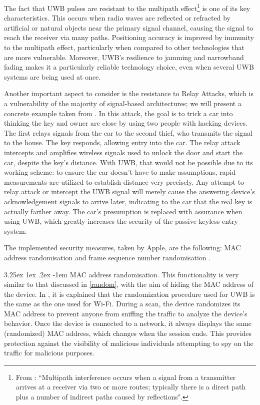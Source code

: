 \documentclass[english]{article}
\makeatletter
\newcounter{subsubsubsection}[subsubsection]
\renewcommand\paragraph{\@startsection{paragraph}{5}{\z@}%
  {3.25ex \@plus1ex \@minus.2ex}%
  {-1em}%
  {\normalfont\normalsize\bfseries}}
\makeatother
\begin{document}
The fact that UWB pulses are resistant to the multipath effect\footnote{From \cite{Figueroa2022}: ``Multipath interference occurs when a signal from a transmitter arrives at a receiver via two or more routes; typically there is a direct path plus a number of indirect paths caused by reflections".} is one of its key characteristics. This occurs when radio waves are reflected or refracted by artificial or natural objects near the primary signal channel, causing the signal to reach the receiver via many paths. Positioning accuracy is improved by immunity to the multipath effect, particularly when compared to other technologies that are more vulnerable. Moreover, UWB's resilience to jamming and narrowband fading makes it a particularly reliable technology choice, even when several UWB systems are being used at once.

Another important aspect to consider is the resistance to Relay Attacks, which is a vulnerability of the majority of signal-based architectures; we will present a concrete example taken from \cite{Global_2020}. In this attack, the goal is to trick a car into thinking the key and owner are close by using two people with hacking devices. The first relays signals from the car to the second thief, who transmits the signal to the house. The key responds, allowing entry into the car. The relay attack intercepts and amplifies wireless signals used to unlock the door and start the car, despite the key's distance. With UWB, that would not be possible due to its working scheme: to ensure the car doesn't have to make assumptions, rapid measurements are utilized to establish distance very precisely. Any attempt to relay attack or intercept the UWB signal will merely cause the answering device's acknowledgement signals to arrive later, indicating to the car that the real key is actually farther away. The car's presumption is replaced with assurance when using UWB, which greatly increases the security of the passive keyless entry system.

The implemented security measures, taken by Apple, are the following: MAC address randomisation and frame sequence number randomisation \cite{aps}.

\paragraph{MAC address randomisation.}
This functionality is very similar to that discussed in \ref{random}, with the aim of hiding the MAC address of the device. In \cite{aps}, it is explained that the randomization procedure used for UWB is the same as the one used for Wi-Fi. During a scan, the device randomizes its MAC address to prevent anyone from sniffing the traffic to analyze the device's behavior. Once the device is connected to a network, it always displays the same (randomized) MAC address, which changes when the session ends. This provides protection against the visibility of malicious individuals attempting to spy on the traffic for malicious purposes.
\end{document}
